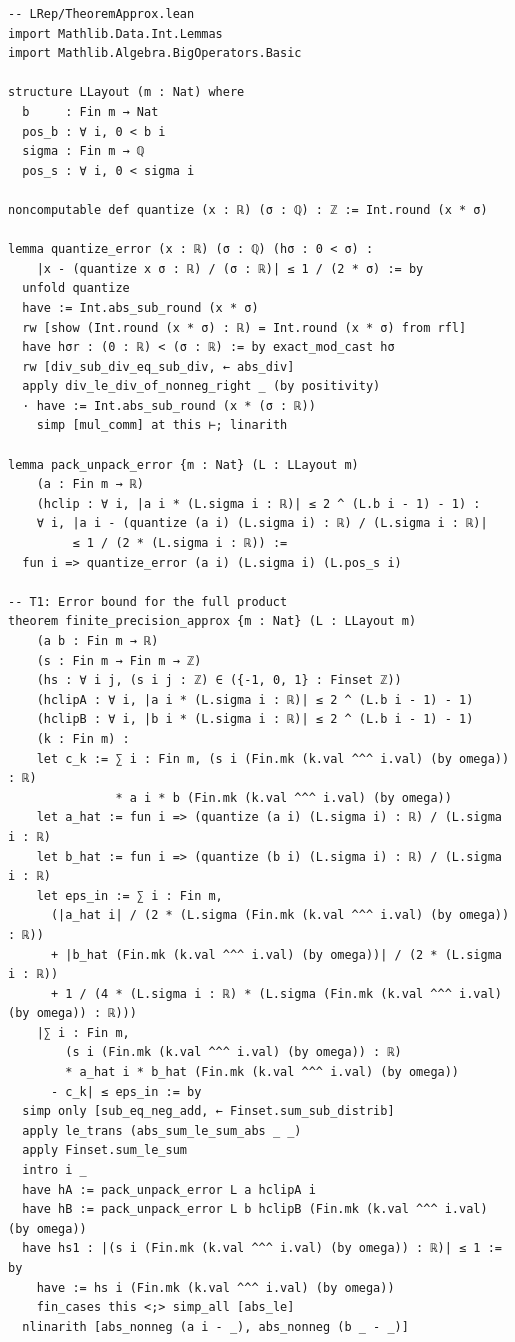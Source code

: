 \documentclass[11pt,a4paper]{article}
\theoremstyle{definition}
\theoremstyle{plain}
\theoremstyle{remark}
\begin{document}
\begin{leanblock}
\begin{lstlisting}[language={}]
-- LRep/TheoremApprox.lean
import Mathlib.Data.Int.Lemmas
import Mathlib.Algebra.BigOperators.Basic

structure LLayout (m : Nat) where
  b     : Fin m → Nat
  pos_b : ∀ i, 0 < b i
  sigma : Fin m → ℚ
  pos_s : ∀ i, 0 < sigma i

noncomputable def quantize (x : ℝ) (σ : ℚ) : ℤ := Int.round (x * σ)

lemma quantize_error (x : ℝ) (σ : ℚ) (hσ : 0 < σ) :
    |x - (quantize x σ : ℝ) / (σ : ℝ)| ≤ 1 / (2 * σ) := by
  unfold quantize
  have := Int.abs_sub_round (x * σ)
  rw [show (Int.round (x * σ) : ℝ) = Int.round (x * σ) from rfl]
  have hσr : (0 : ℝ) < (σ : ℝ) := by exact_mod_cast hσ
  rw [div_sub_div_eq_sub_div, ← abs_div]
  apply div_le_div_of_nonneg_right _ (by positivity)
  · have := Int.abs_sub_round (x * (σ : ℝ))
    simp [mul_comm] at this ⊢; linarith

lemma pack_unpack_error {m : Nat} (L : LLayout m)
    (a : Fin m → ℝ)
    (hclip : ∀ i, |a i * (L.sigma i : ℝ)| ≤ 2 ^ (L.b i - 1) - 1) :
    ∀ i, |a i - (quantize (a i) (L.sigma i) : ℝ) / (L.sigma i : ℝ)|
         ≤ 1 / (2 * (L.sigma i : ℝ)) :=
  fun i => quantize_error (a i) (L.sigma i) (L.pos_s i)

-- T1: Error bound for the full product
theorem finite_precision_approx {m : Nat} (L : LLayout m)
    (a b : Fin m → ℝ)
    (s : Fin m → Fin m → ℤ)
    (hs : ∀ i j, (s i j : ℤ) ∈ ({-1, 0, 1} : Finset ℤ))
    (hclipA : ∀ i, |a i * (L.sigma i : ℝ)| ≤ 2 ^ (L.b i - 1) - 1)
    (hclipB : ∀ i, |b i * (L.sigma i : ℝ)| ≤ 2 ^ (L.b i - 1) - 1)
    (k : Fin m) :
    let c_k := ∑ i : Fin m, (s i (Fin.mk (k.val ^^^ i.val) (by omega)) : ℝ)
               * a i * b (Fin.mk (k.val ^^^ i.val) (by omega))
    let a_hat := fun i => (quantize (a i) (L.sigma i) : ℝ) / (L.sigma i : ℝ)
    let b_hat := fun i => (quantize (b i) (L.sigma i) : ℝ) / (L.sigma i : ℝ)
    let eps_in := ∑ i : Fin m,
      (|a_hat i| / (2 * (L.sigma (Fin.mk (k.val ^^^ i.val) (by omega)) : ℝ))
      + |b_hat (Fin.mk (k.val ^^^ i.val) (by omega))| / (2 * (L.sigma i : ℝ))
      + 1 / (4 * (L.sigma i : ℝ) * (L.sigma (Fin.mk (k.val ^^^ i.val) (by omega)) : ℝ)))
    |∑ i : Fin m,
        (s i (Fin.mk (k.val ^^^ i.val) (by omega)) : ℝ)
        * a_hat i * b_hat (Fin.mk (k.val ^^^ i.val) (by omega))
      - c_k| ≤ eps_in := by
  simp only [sub_eq_neg_add, ← Finset.sum_sub_distrib]
  apply le_trans (abs_sum_le_sum_abs _ _)
  apply Finset.sum_le_sum
  intro i _
  have hA := pack_unpack_error L a hclipA i
  have hB := pack_unpack_error L b hclipB (Fin.mk (k.val ^^^ i.val) (by omega))
  have hs1 : |(s i (Fin.mk (k.val ^^^ i.val) (by omega)) : ℝ)| ≤ 1 := by
    have := hs i (Fin.mk (k.val ^^^ i.val) (by omega))
    fin_cases this <;> simp_all [abs_le]
  nlinarith [abs_nonneg (a i - _), abs_nonneg (b _ - _)]
\end{lstlisting}
\end{leanblock}
\end{document}
